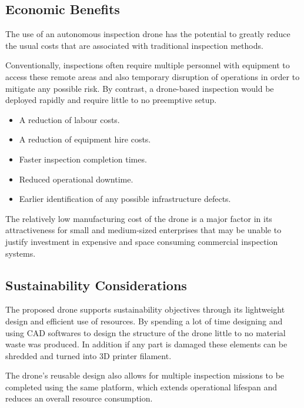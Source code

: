 \documentclass[conference]{IEEEtran}
\begin{document}
\subsection*{Economic Benefits}

The use of an autonomous inspection drone has the potential to greatly reduce the usual costs that are associated with traditional inspection methods.

Conventionally, inspections often require multiple personnel with equipment to access these remote areas and also temporary disruption of operations in order to mitigate any possible risk. By contrast, a drone-based inspection would be deployed rapidly and require little to no  preemptive setup.


\begin{itemize}

    \item A reduction of labour costs.

    \item A reduction of equipment hire costs.

    \item Faster inspection completion times.

    \item Reduced operational downtime.

    \item Earlier identification of any possible infrastructure defects.

\end{itemize}

The relatively low manufacturing cost of the drone is a major factor in its attractiveness for small and medium-sized enterprises that may be unable to justify investment in expensive and space consuming commercial inspection systems.

\subsection*{Sustainability Considerations}

The proposed drone supports sustainability objectives through its lightweight design and efficient use of resources. By spending a lot of time designing and using CAD softwares to design the structure of the drone little to no material waste was produced. In addition if any part is damaged these elements can be shredded and turned into 3D printer filament.

The drone’s reusable design also allows for multiple inspection missions to be completed using the same platform, which extends operational lifespan and reduces an overall resource consumption.
\end{document}
